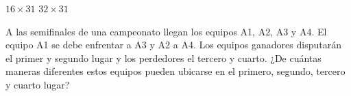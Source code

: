 \documentclass[10pt,letterpaper,addpoints]{exam}
\begin{document}
\begin{multicols}{2}
\begin{questions}
\begin{oneparchoices}
 \CorrectChoice $16\times 31$
 \choice $32\times 31$
\end{oneparchoices}
\question \label{lastq3} A las semifinales de una campeonato llegan los equipos A1, A2, A3 y A4. El equipo A1 se debe enfrentar a A3 y A2 a A4. Los equipos ganadores disputarán el primer y segundo lugar y los perdedores el tercero y cuarto. ¿De cuántas maneras diferentes estos equipos pueden ubicarse en el primero, segundo, tercero y cuarto lugar?

\begin{oneparchoices}
\end{oneparchoices}

\end{questions}
\end{multicols}
\end{document}
